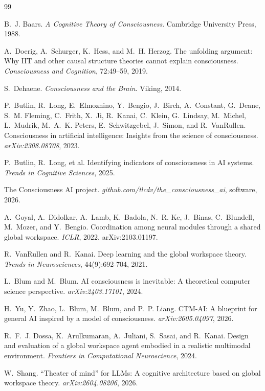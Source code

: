 \documentclass[11pt]{article}
\begin{document}
\begin{thebibliography}{99}\small

 B.~J. Baars. \emph{A Cognitive Theory of Consciousness}.
Cambridge University Press, 1988.

 A.~Doerig, A.~Schurger, K.~Hess, and M.~H. Herzog. The
unfolding argument: Why IIT and other causal structure theories cannot explain
consciousness. \emph{Consciousness and Cognition}, 72:49--59, 2019.

 S.~Dehaene. \emph{Consciousness and the Brain}. Viking,
2014.

 P.~Butlin, R.~Long, E.~Elmoznino, Y.~Bengio, J.~Birch,
A.~Constant, G.~Deane, S.~M. Fleming, C.~Frith, X.~Ji, R.~Kanai, C.~Klein,
G.~Lindsay, M.~Michel, L.~Mudrik, M.~A.~K. Peters, E.~Schwitzgebel, J.~Simon,
and R.~VanRullen. Consciousness in artificial intelligence: Insights from the
science of consciousness. \emph{arXiv:2308.08708}, 2023.

 P.~Butlin, R.~Long, et al. Identifying indicators of
consciousness in AI systems. \emph{Trends in Cognitive Sciences}, 2025.

 The Consciousness AI project.
\emph{github.com/tlcdv/the\_consciousness\_ai}, software, 2026.

 A.~Goyal, A.~Didolkar, A.~Lamb, K.~Badola, N.~R. Ke,
J.~Binas, C.~Blundell, M.~Mozer, and Y.~Bengio. Coordination among neural
modules through a shared global workspace. \emph{ICLR}, 2022. arXiv:2103.01197.

 R.~VanRullen and R.~Kanai. Deep learning and the global
workspace theory. \emph{Trends in Neurosciences}, 44(9):692-704, 2021.

 L.~Blum and M.~Blum. AI consciousness is inevitable: A
theoretical computer science perspective. \emph{arXiv:2403.17101}, 2024.

 H.~Yu, Y.~Zhao, L.~Blum, M.~Blum, and P.~P. Liang. CTM-AI: A
blueprint for general AI inspired by a model of consciousness.
\emph{arXiv:2605.04097}, 2026.

 R.~F.~J. Dossa, K.~Arulkumaran, A.~Juliani, S.~Sasai, and
R.~Kanai. Design and evaluation of a global workspace agent embodied in a
realistic multimodal environment. \emph{Frontiers in Computational
Neuroscience}, 2024.

 W.~Shang. ``Theater of mind'' for LLMs: A cognitive
architecture based on global workspace theory. \emph{arXiv:2604.08206}, 2026.


\end{thebibliography}
\end{document}
